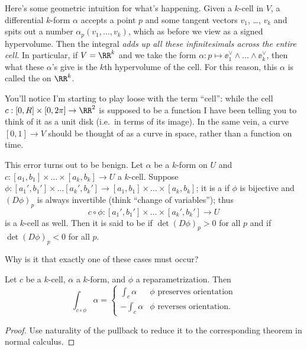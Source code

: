 \documentclass[11pt]{scrreprt}
\begin{document}
Here's some geometric intuition for what's happening.
Given a $k$-cell in $V$, a differential $k$-form $\alpha$ accepts a point $p$ and some tangent vectors $v_1$, \dots, $v_k$
and spits out a number $\alpha_p(v_1, \dots, v_k)$,
which as before we view as a signed hypervolume.
Then the integral \emph{adds up all these infinitesimals across the entire cell}.
In particular, if $V = \RR^k$ and we take the form $\alpha : p \mapsto \ee_1^\vee \wedge \dots \wedge \ee_k^\vee$,
then what these $\alpha$'s give is the $k$th hypervolume of the cell.
For this reason, this $\alpha$ is called the  on $\RR^k$.

You'll notice I'm starting to play loose with the term ``cell'':
while the cell $c : [0,R] \times [0,2\pi] \to \RR^2$ is supposed to be a function
I have been telling you to think of it as a unit disk (i.e.\ in terms of its image).
In the same vein, a curve $[0,1] \to V$ should be thought of as a curve in space,
rather than a function on time.

This error turns out to be benign.
Let $\alpha$ be a $k$-form on $U$ and $c : [a_1, b_1] \times \dots \times [a_k, b_k] \to U$ a $k$-cell.
Suppose $\phi : [a_1', b_1'] \times \dots [a_k', b_k'] \to [a_1, b_1] \times \dots \times [a_k, b_k]$;
it is a  if $\phi$ is bijective and $(D\phi)_p$ is always invertible
(think ``change of variables'');
thus
\[ c \circ \phi : [a_1', b_1'] \times \dots \times [a_k',b_k'] \to U \]
is a $k$-cell as well.
Then it is said to be  if $\det(D\phi)_p > 0$ for all $p$
and  if $\det(D\phi)_p < 0$ for all $p$.
\begin{exercise}
	Why is it that exactly one of these cases must occur?
\end{exercise}

\begin{theorem}
	Let $c$ be a $k$-cell, $\alpha$ a $k$-form, and $\phi$ a reparametrization.
	Then
	\[ \int_{c \circ \phi} \alpha
		=
		\begin{cases}
			\int_c \alpha & \phi \text{ preserves orientation} \\
			- \int_c \alpha & \phi \text{ reverses orientation}.
		\end{cases}
	\]
\end{theorem}
\begin{proof}
	Use naturality of the pullback to reduce it to the corresponding
	theorem in normal calculus.
\end{proof}
\end{document}
